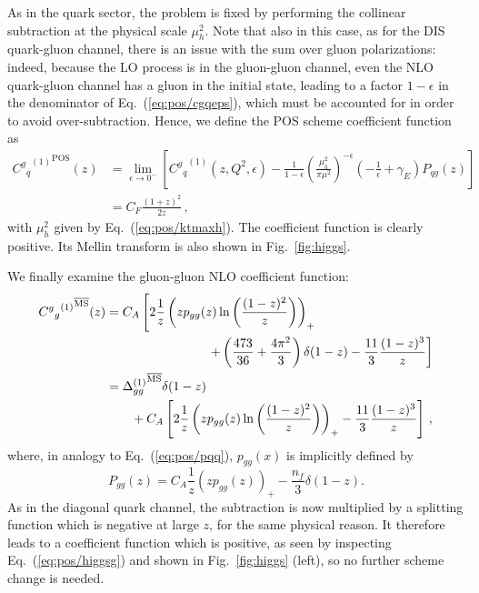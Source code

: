As in the quark sector, the problem is fixed by performing the
collinear subtraction at the physical scale $\mu_h^2$. Note that
also in this case, as for the DIS quark-gluon channel,
there is an issue with the sum over gluon polarizations: indeed,
because the LO process is in the gluon-gluon channel, even the NLO
quark-gluon channel has a gluon in the initial state, leading
to a factor  $1-\epsilon$ in the 
denominator of Eq.~(\ref{eq:pos/cgqeps}), which must be accounted for in
order to avoid over-subtraction.
Hence, we define the POS scheme coefficient function as
\begin{align}\label{eq:pos/cqrenposh}
  {{C^g{}_q}^{(1)}}^{\textrm{POS}} (z)  &= \lim_{\epsilon\to0^-}
  \left[  {C^g{}_q}^{(1)}(z,Q^2,\epsilon) - \frac{1}{1-\epsilon}\left(\frac{\mu_h^2}{\pi\mu^2}\right)^{-\epsilon} \left(-\frac 1
    {\epsilon}+\gamma_E\right) P_{qg}(z)\right]\\ \label{eq:pos/cqrenposh1}
    &=C_F \frac{(1+z)^2}{2z} \, ,
\end{align}
with $\mu_h^2$ given by Eq.~(\ref{eq:pos/ktmaxh}).
The coefficient function is clearly positive. Its Mellin transform is
also shown in Fig.~\ref{fig:higgs}.

We finally examine the gluon-gluon NLO coefficient function:
\begin{align}
  \label{eq:pos/higgsg}
  {{C^g{}_g}^{(1)}}^{{\overline{\textrm{MS}}}} (z) 
  &=C_A\left[ 2\frac 1 z \left(z p_{gg}(z) \ln\left(\frac{(1-z)^2}{z}\right) \right)_+
    \right. \nonumber\\
    &\qquad\qquad\qquad\qquad \left.
      + \left(\frac{473}{36} + \frac{4\pi^2}{3}\right)\delta(1-z) -
      \frac{11}{3}\frac{(1-z)^3}{z} \right]\\
    &={\Delta^{(1)}_{gg}}^{{\overline{\textrm{MS}}}}\delta(1-z)
      \nonumber\\
      &\qquad
      + C_A \left[ 2\frac 1 z \left(z p_{gg}(z) \ln\left(\frac{(1-z)^2}{z}\right) \right)_+-
      \frac{11}{3}\frac{(1-z)^3}{z}\right] \,,
\end{align}
where, in analogy to Eq.~(\ref{eq:pos/pqq}), $p_{gg}(x)$ is implicitly
defined by
\begin{equation}\label{eq:pos/pgg}
  P_{gg}(z)= C_A\frac 1 z \left(z p_{gg}(z)\right)_+ - \frac{n_f}{3} \delta(1-z).
\end{equation}
As in the diagonal quark channel, the \msbar{} subtraction is now
multiplied by a splitting function which is negative at large $z$, for
the same physical reason. It therefore leads to a coefficient function
which is positive, as seen by inspecting Eq.~(\ref{eq:pos/higgsg}) and
shown in Fig.~\ref{fig:higgs} (left), so no further scheme change is needed.

